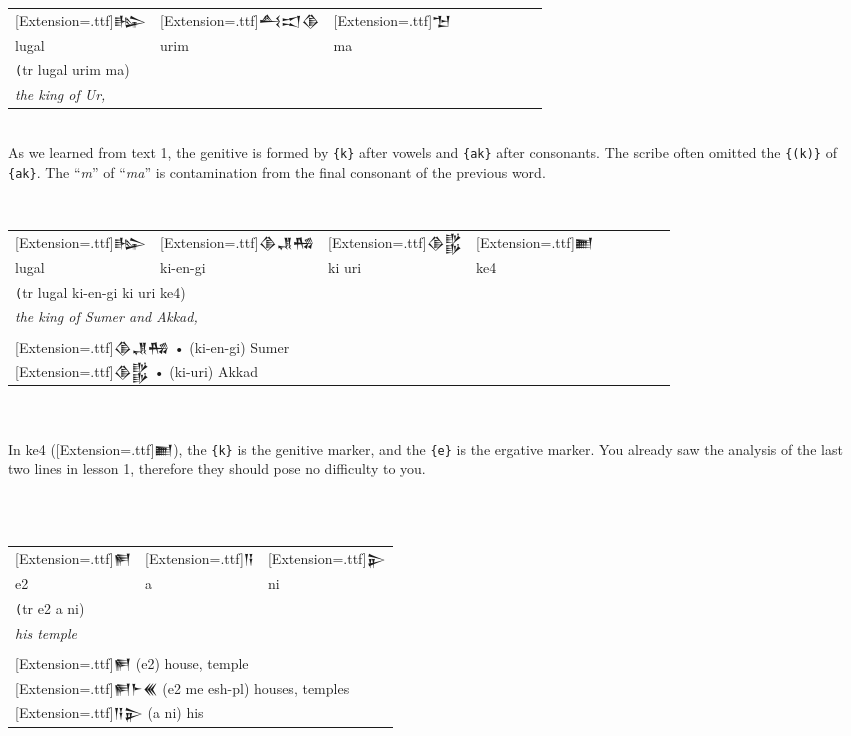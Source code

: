 \documentclass[a4paper,12pt]{book}
\newcommand{\fcn}{\setmainfont{Akkadian}[Extension=.ttf]}
\newcommand{\fcm}{\large\setmainfont{Akkadian}[Extension=.ttf]}
\begin{document}
 \newpage
 \noindent    
 \begin{tabular}[!h]{l l l l l l l l l}
   \fcm 𒈗 &\fcm 𒋀𒀊𒆠
   &\fcm 𒈠\\
   lugal & urim & ma\\
   \multicolumn{3}{l}{\texttt (tr lugal urim ma)}\\
   \multicolumn{3}{l}{\em the king of Ur,}\\
 \end{tabular}\verb||\\

 As we learned from text 1, the genitive is
 formed by \verb|{k}| after vowels
 and \verb|{ak}| after consonants.
 The scribe often omitted the \verb|{(k)}|
 of \verb|{ak}|. The ``{\em m}'' of
 ``{\em ma}'' is contamination from the final
 consonant of the previous word.

\verb||\\
 \begin{tabular}[!h]{l l l l l l l l l}
   \fcm 𒈗 &\fcm 𒆠𒂗𒄀
   &\fcm 𒆠𒌵 &\fcm 𒆤 \\
   lugal & ki-en-gi & ki uri & ke4\\
   \multicolumn{4}{l}{\texttt (tr lugal ki-en-gi ki uri ke4)}\\
   \multicolumn{4}{l}{\em the king of Sumer and Akkad,}\\
   \hline\\
     \multicolumn{4}{l}{{\fcn 𒆠𒂗𒄀} • (ki-en-gi) Sumer }\\
  \multicolumn{4}{l}{{\fcn 𒆠𒌵} • (ki-uri) Akkad }\\
 \end{tabular}\verb||\\
 
 
 \verb||\\
 In ke4 ({\fcn 𒆤}), the \verb|{k}| is the
 genitive marker, and the \verb|{e}| is the ergative marker.
 You already saw the analysis of the last two
 lines in lesson 1, therefore they should pose
 no difficulty to you.
 
 \verb||\\
 \verb||\\
\begin{tabular}[!h]{l l l}
\fcm 𒂍
&\fcm 𒀀 &\fcm 𒉌\\
  e2 & a & ni\\
\multicolumn{3}{l}{\texttt (tr e2 a ni)}\\
\multicolumn{3}{l}{\em his temple}\\
\hline\\
\multicolumn{3}{l}{{\fcn 𒂍}
  (e2)  house, temple}\\
\multicolumn{3}{l}{{\fcn 𒂍𒈨𒌍}
                    (e2 me esh-pl) houses, temples }\\
\multicolumn{3}{l}{{\fcn 𒀀𒉌}
                    (a ni) his }\\
\end{tabular}
\end{document}

